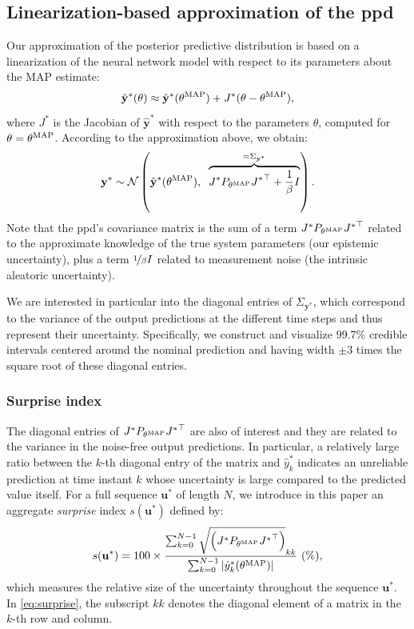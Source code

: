 \documentclass{article}
\newcommand{\nsamp}{N}
\newcommand{\N}{\mathcal{N}} %
\newcommand{\MAP}{{\rm MAP}}
\newcommand{\tvec}[1]{{\mathbf{#1}}}
\newcommand{\mean}[1]{\hat{#1}}
\begin{document}
\subsection{Linearization-based approximation of the ppd}
Our approximation of the posterior predictive distribution is based on a linearization of the neural network model with respect to its parameters about the MAP estimate:
\begin{equation}
 \mean{\tvec{y}}^*(\theta) \approx \mean{\tvec{y}}^*(\theta^{\MAP}) + J^*(\theta - \theta^{\MAP}),%
\end{equation}
where $J^{*}$ is the Jacobian of $\mean{\tvec{y}}^*$ with respect to the parameters $\theta$, computed for $\theta=\theta^{\rm MAP}$.
According to the approximation above, we obtain:
\begin{equation}
\label{eq:ppd_approx}
 \tvec{y}^* \sim \N \left(\mean{\tvec{y}}^*(\theta^{\MAP}),\;\; \overbrace{J^* P_{\theta^{\MAP}} {J^*}^\top  + \frac{1}{\beta} I}^{=\Sigma_{\tvec{y}^*}} \right).
\end{equation}
Note that the ppd's covariance matrix is the sum of a term $J^* P_{\theta^{\MAP}} {J^*}^\top$ related to the approximate knowledge of the true system parameters (our epistemic uncertainty), plus a term $\nicefrac{1}{\beta} I$ related to measurement noise (the intrinsic aleatoric uncertainty). 

We are interested in particular into the diagonal entries of $\Sigma_{\tvec{y}^*}$, which correspond to the variance of the output predictions at the different time steps and thus represent their uncertainty. Specifically, we construct and visualize 99.7\% credible intervals centered around the nominal prediction and having width $\pm 3$ times the square root of these diagonal entries.

\subsubsection{Surprise index}
The diagonal entries of $J^* P_{\theta^{\MAP}} {J^*}^\top$ are also of interest and they are related to the variance in the noise-free output predictions. In particular, a relatively large ratio between the $k$-th diagonal entry of the matrix and $\mean{{y}}^*_{k}$ indicates an unreliable prediction at time instant $k$ whose uncertainty is large compared to the predicted value itself. 
For a full sequence $\tvec{u}^*$ of length $\nsamp$, we introduce in this paper an aggregate \emph{surprise} index $s(\tvec{u}^*)$ defined by:
\begin{equation}
\label{eq:surprise}
s(\tvec{u}^*) =  100 \times \frac{\sum_{k=0}^{\nsamp-1} \sqrt{\left (J^* P_{\theta^{\MAP}} {J^*}^\top \right )}_{kk}}{\sum_{k=0}^{\nsamp-1} |\mean{y}_k^{*}(\theta^{\MAP})|}~(\%),
\end{equation}
which measures the relative size of the uncertainty throughout the sequence $\tvec{u}^*$. In \eqref{eq:surprise}, the subscript  $kk$ denotes the diagonal element of a matrix in the $k$-th row and column.   
\end{document}
